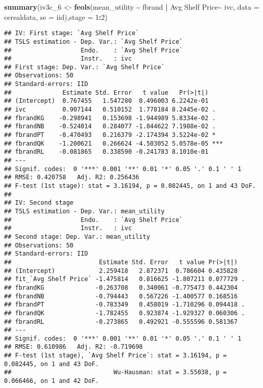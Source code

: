 \documentclass[
]{article}
\newenvironment{Shaded}{\begin{snugshade}}{\end{snugshade}}
\newcommand{\AttributeTok}[1]{\textcolor[rgb]{0.13,0.29,0.53}{#1}}
\newcommand{\DecValTok}[1]{\textcolor[rgb]{0.00,0.00,0.81}{#1}}
\newcommand{\FunctionTok}[1]{\textcolor[rgb]{0.13,0.29,0.53}{\textbf{#1}}}
\newcommand{\NormalTok}[1]{#1}
\newcommand{\OtherTok}[1]{\textcolor[rgb]{0.56,0.35,0.01}{#1}}
\newcommand{\SpecialCharTok}[1]{\textcolor[rgb]{0.81,0.36,0.00}{\textbf{#1}}}
\newcommand{\StringTok}[1]{\textcolor[rgb]{0.31,0.60,0.02}{#1}}
\begin{document}
\begin{Shaded}
\begin{Highlighting}[]
\FunctionTok{summary}\NormalTok{(iv3c\_6 }\OtherTok{\textless{}{-}} \FunctionTok{feols}\NormalTok{(mean\_utility }\SpecialCharTok{\textasciitilde{}}\NormalTok{ fbrand }\SpecialCharTok{|}  \StringTok{\textasciigrave{}}\AttributeTok{Avg Shelf Price}\StringTok{\textasciigrave{}}\SpecialCharTok{\textasciitilde{}}\NormalTok{ ivc, }\AttributeTok{data =}\NormalTok{ cerealdata,}
                     \AttributeTok{se =} \StringTok{\textquotesingle{}iid\textquotesingle{}}\NormalTok{),}\AttributeTok{stage =} \DecValTok{1}\SpecialCharTok{:}\DecValTok{2}\NormalTok{)}
\end{Highlighting}
\end{Shaded}

\begin{verbatim}
## IV: First stage: `Avg Shelf Price`
## TSLS estimation - Dep. Var.: `Avg Shelf Price`
##                   Endo.    : `Avg Shelf Price`
##                   Instr.   : ivc
## First stage: Dep. Var.: `Avg Shelf Price`
## Observations: 50
## Standard-errors: IID 
##              Estimate Std. Error   t value   Pr(>|t|)    
## (Intercept)  0.767455   1.547280  0.496003 6.2242e-01    
## ivc          0.907144   0.510152  1.778184 8.2445e-02 .  
## fbrandKG    -0.298941   0.153698 -1.944989 5.8334e-02 .  
## fbrandNB    -0.524014   0.284077 -1.844622 7.1988e-02 .  
## fbrandPT    -0.470493   0.216379 -2.174394 3.5224e-02 *  
## fbrandQK    -1.200621   0.266624 -4.503052 5.0578e-05 ***
## fbrandRL    -0.081865   0.338590 -0.241783 8.1010e-01    
## ---
## Signif. codes:  0 '***' 0.001 '**' 0.01 '*' 0.05 '.' 0.1 ' ' 1
## RMSE: 0.420758   Adj. R2: 0.256436
## F-test (1st stage): stat = 3.16194, p = 0.082445, on 1 and 43 DoF.
## 
## IV: Second stage
## TSLS estimation - Dep. Var.: mean_utility
##                   Endo.    : `Avg Shelf Price`
##                   Instr.   : ivc
## Second stage: Dep. Var.: mean_utility
## Observations: 50
## Standard-errors: IID 
##                        Estimate Std. Error   t value Pr(>|t|)    
## (Intercept)            2.259418   2.872371  0.786604 0.435828    
## fit_`Avg Shelf Price` -1.475814   0.816625 -1.807211 0.077729 .  
## fbrandKG              -0.263708   0.340061 -0.775473 0.442304    
## fbrandNB              -0.794443   0.567226 -1.400577 0.168516    
## fbrandPT              -0.783349   0.458019 -1.710296 0.094418 .  
## fbrandQK              -1.782455   0.923874 -1.929327 0.060306 .  
## fbrandRL              -0.273865   0.492921 -0.555596 0.581367    
## ---
## Signif. codes:  0 '***' 0.001 '**' 0.01 '*' 0.05 '.' 0.1 ' ' 1
## RMSE: 0.610986   Adj. R2: -0.719698
## F-test (1st stage), `Avg Shelf Price`: stat = 3.16194, p = 0.082445, on 1 and 43 DoF.
##                            Wu-Hausman: stat = 3.55038, p = 0.066466, on 1 and 42 DoF.
\end{verbatim}
\end{document}
